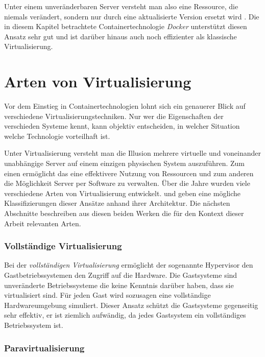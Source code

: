 Unter einem unveränderbaren Server versteht man also eine Ressource, die niemals verändert, sondern nur durch eine aktualisierte Version ersetzt wird \cite{ImmutableServer}. Die in diesem Kapitel betrachtete Containertechnologie \textit{Docker} unterstützt diesen Ansatz sehr gut und ist darüber hinaus auch noch effizienter als klassische Virtualisierung.

\section{Arten von Virtualisierung}

Vor dem Einstieg in Containertechnologien lohnt sich ein genauerer Blick auf verschiedene Virtualisierungstechniken. Nur wer die Eigenschaften der verschieden Systeme kennt, kann objektiv entscheiden, in welcher Situation welche Technologie vorteilhaft ist.

Unter Virtualisierung versteht man die Illusion mehrere virtuelle und voneinander unabhängige Server auf einem einzigen physischen System auszuführen. Zum einen ermöglicht das eine effektivere Nutzung von Ressourcen und zum anderen die Möglichkeit Server per Software zu verwalten. Über die Jahre wurden viele verschiedene Arten von Virtualisierung entwickelt. \cite{VirtualizationBasics} und \cite{Smith:2005:AVM:1069588.1069632} geben eine mögliche Klassifizierungen dieser Ansätze anhand ihrer Architektur. Die nächsten Abschnitte beschreiben aus diesen beiden Werken die für den Kontext dieser Arbeit relevanten Arten.

\subsubsection{Vollständige Virtualisierung}

Bei der \textit{vollständigen Virtualisierung} ermöglicht der sogenannte Hypervisor den Gastbetriebssystemen den Zugriff auf die Hardware. Die Gastsysteme sind unveränderte Betriebssysteme die keine Kenntnis darüber haben, dass sie virtualisiert sind. Für jeden Gast wird sozusagen eine vollständige Hardwareumgebung simuliert. Dieser Ansatz schützt die Gastsysteme gegenseitig sehr effektiv, er ist ziemlich aufwändig, da jedes Gastsystem ein vollständiges Betriebssystem ist.

\subsubsection{Paravirtualisierung}

